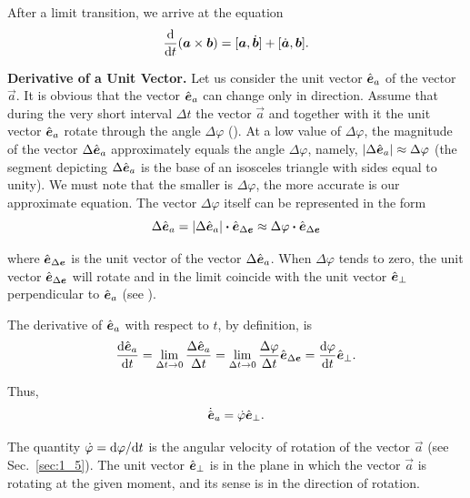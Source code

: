 \noindent
After a limit transition, we arrive at the equation
\begin{equation}\label{eq:1_55}
\frac{\mathrm{d}}{\mathrm{d} t}(\boldsymbol{a}\times\boldsymbol{b}) = [\boldsymbol{a},\dot{\boldsymbol{b}}] + [\dot{\boldsymbol{a}},\boldsymbol{b}].
\end{equation}

\textbf{Derivative of a Unit Vector.} Let us consider the unit vector $\hat{\boldsymbol{e}}_{a}$ of the vector $\vec{a}$. It is obvious that the vector $\hat{\boldsymbol{e}}_{a}$ can change only in direction. Assume that during the very short interval $\Delta t$ the vector $\vec{a}$ and together with it the unit vector $\hat{\boldsymbol{e}}_{a}$ rotate through the angle $\Delta\varphi$ (). At a low value of $\Delta\varphi$, the magnitude of the vector $\Delta\hat{\boldsymbol{e}}_{a}$ approximately equals the angle $\Delta\varphi$, namely, $|\Delta\hat{\boldsymbol{e}}_{a}|\approx\Delta\varphi$ (the segment depicting $\Delta\hat{\boldsymbol{e}}_{a}$ is the base of an isosceles triangle with sides equal to unity). We must note that the smaller is $\Delta\varphi$, the more accurate is our approximate equation. The vector $\Delta\varphi$ itself can be represented in the form
\begin{equation*}
\Delta\hat{\boldsymbol{e}}_{a} = |\Delta\hat{\boldsymbol{e}}_{a}| \boldsymbol{\cdot} \hat{\boldsymbol{e}}_{\Delta\boldsymbol{e}} \approx \Delta\varphi \boldsymbol{\cdot} \hat{\boldsymbol{e}}_{\Delta\boldsymbol{e}}
\end{equation*}

\noindent
where $\hat{\boldsymbol{e}}_{\Delta\boldsymbol{e}}$ is the unit vector of the vector $\Delta\hat{\boldsymbol{e}}_{a}$. When $\Delta\varphi$ tends to zero, the unit vector $\hat{\boldsymbol{e}}_{\Delta\boldsymbol{e}}$ will rotate and in the limit coincide with the unit vector $\hat{\boldsymbol{e}}_{\perp}$ perpendicular to $\hat{\boldsymbol{e}}_{a}$ (see ).

The derivative of $\hat{\boldsymbol{e}}_{a}$ with respect to $t$, by definition, is
\begin{equation*}
\frac{\mathrm{d}\hat{\boldsymbol{e}}_{a}}{\mathrm{d} t} = \lim_{\Delta t\to 0} \frac{\Delta\hat{\boldsymbol{e}}_{a}}{\Delta t} = \lim_{\Delta t\to 0} \frac{\Delta\varphi}{\Delta t}\hat{\boldsymbol{e}}_{\Delta\boldsymbol{e}} = \frac{\mathrm{d}\varphi}{\mathrm{d} t}\hat{\boldsymbol{e}}_{\perp}.
\end{equation*}

\noindent
Thus,
\begin{equation}\label{eq:1_56}
\dot{\hat{\boldsymbol{e}}}_{a} = \dot{\varphi}\hat{\boldsymbol{e}}_{\perp}.
\end{equation}

\noindent
The quantity $\dot{\varphi}=\mathrm{d}\varphi/\mathrm{d} t$ is the angular velocity of rotation of the vector $\vec{a}$ (see Sec.~\ref{sec:1_5}). The unit vector $\hat{\boldsymbol{e}}_{\perp}$ is in the plane in which the vector $\vec{a}$ is rotating at the given moment, and its sense is in the direction of rotation.

